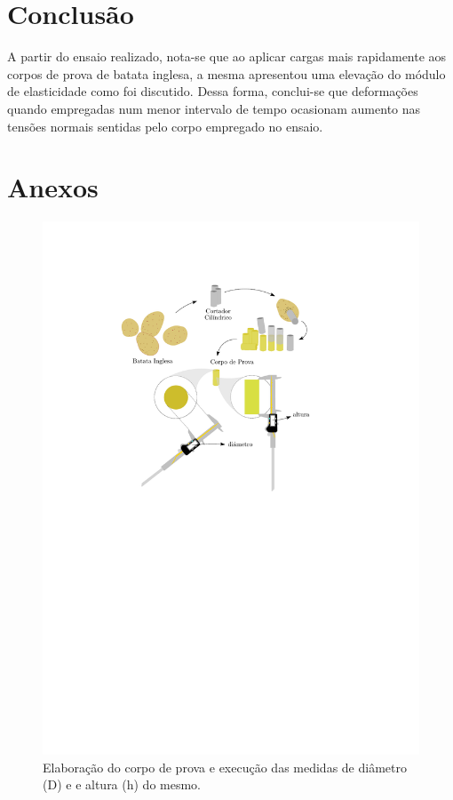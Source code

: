 \documentclass[a4paper, 12pt]{article}
\begin{document}
	\section{Conclusão}
	
	A partir do ensaio realizado, nota-se que ao aplicar cargas mais rapidamente aos corpos de prova de batata inglesa, a mesma apresentou uma elevação do módulo de elasticidade como foi discutido. Dessa forma, conclui-se que deformações quando empregadas num menor intervalo de tempo ocasionam aumento nas tensões normais sentidas pelo corpo empregado no ensaio. 

	\newpage
	\section{Anexos}

	\begin{figure}[h!]
		\centering
		\includegraphics[scale=1.1]{sections/images/potato_diagram}
		\caption{Elaboração do corpo de prova e execução das medidas de diâmetro (D) e e altura (h) do mesmo.}
		\label{potato}
	\end{figure}
	
\end{document}
